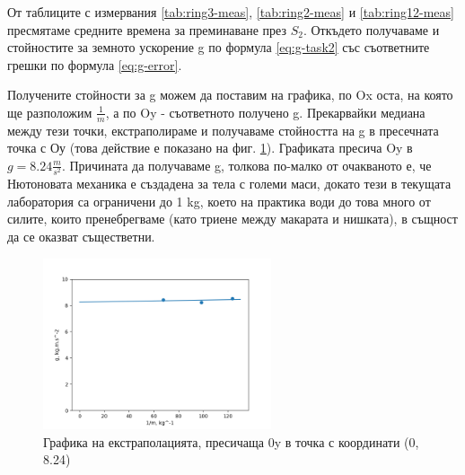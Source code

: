 \documentclass[12pt]{article}
\begin{document}
От таблиците с измервания \ref{tab:ring3-meas}, \ref{tab:ring2-meas} и \ref{tab:ring12-meas} пресмятаме средните времена за преминаване през $S_2$. Откъдето получаваме и стойностите за земното ускорение g по формула \ref{eq:g-task2} със съответните грешки по формула \ref{eq:g-error}.

Получените стойности за g можем да поставим на графика, по Ox оста, на която ще разположим $\frac{1}{m}$, а по Oy - съответното получено g. Прекарвайки медиана между тези точки, екстраполираме и получаваме стойността на g в пресечната точка с Оу (това действие е показано на фиг. \ref{fig:extrapolation-graph}). Графиката пресича Oy в $g = 8.24 \frac{m}{s^2}$. Причината да получаваме g, толкова по-малко от очакваното е, че Нютоновата механика е създадена за тела с големи маси, докато тези в текущата лаборатория са ограничени до 1 kg, което на практика води до това много от силите, които пренебрегваме (като триене между макарата и нишката), в същност да се оказват съществетни.


\begin{figure}
    \centering
    \includegraphics[width=0.6\textwidth]{images/task2.png}
    \caption{Графика на екстраполацията, пресичаща 0y в точка с координати (0, 8.24) }
    \label{fig:extrapolation-graph}
\end{figure}
\end{document}
